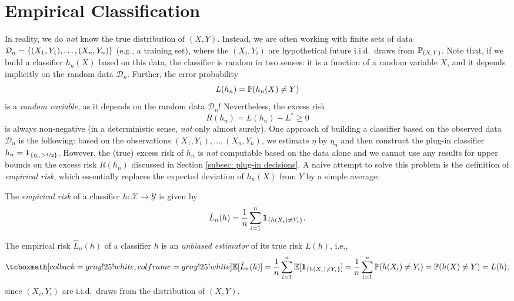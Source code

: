 \section{Empirical Classification}
\label{subsec: empirical classification}

In reality, we do \emph{not} know the true distribution of $(X, Y)$. Instead, we are often working with finite sets of data $\mathcal{D}_n = \set{(X_1, Y_1), \dots, (X_n, Y_n)}$ (e.g., a training set), where the $(X_i, Y_i)$ are hypothetical future i.i.d.\ draws from $\P_{(X, Y)}$. Note that, if we build a classifier $h_n(X)$ based on this data, the classifier is random in two senses: it is a function of a random variable $X$, and it depends implicitly on the random data $\mathcal{D}_n$. Further, the error probability
\[
    L(h_n) = \Prob(h_n(X) \neq Y)
\]
is a \emph{random variable}, as it depends on the random data $\mathcal{D}_n$! Nevertheless, the excess risk
\[
    R(h_n) = L(h_n) - L^* \geq 0
\]
is always non-negative (in a deterministic sense, \emph{not} only almost surely). One approach of building a classifier based on the observed data $\mathcal{D}_n$ is the following: based on the observations $(X_1, Y_1), \dots, (X_n, Y_n)$, we estimate $\eta$ by $\eta_n$ and then construct the plug-in classifier $h_n = \indSet{\eta_n > \nicefrac{1}{2}}$. However, the (true) excess risk of $h_n$ is \emph{not} computable based on the data alone and we cannot use any results for upper bounds on the excess risk $R(h_n)$ discussed in Section \ref{subsec: plug-in decisions}. A naive attempt to solve this problem is the definition of \emph{empirical risk}, which essentially replaces the expected deviation of $h_n(X)$ from $Y$ by a simple average:

\begin{definition}
The \emph{empirical risk} of a classifier $h \colon \mathcal{X} \to \mathcal{Y}$ is given by
\[
    \hat L_n(h) = \frac{1}{n} \sum_{i=1}^n \indSet{h(X_i) \neq Y_i}.
\]
\end{definition}

The empirical risk $\hat L_n(h)$ of a classifier $h$ is an \emph{unbiased estimator} of its true risk $L(h)$, i.e.,
\begin{equation}
\label{eq: bias of empirical risk}
    \highlightMath{
        \Exp[\hat{L}_n(h)] = \frac{1}{n} \sum_{i=1}^n \Exp[\indSet{h(X_i) \neq Y_i}] = \frac{1}{n} \sum_{i=1}^n \Prob(h(X_i) \neq Y_i) = \Prob(h(X) \neq Y) = L(h),
    }
\end{equation}
since $(X_i, Y_i)$ are i.i.d.\ draws from the distribution of $(X, Y)$.

